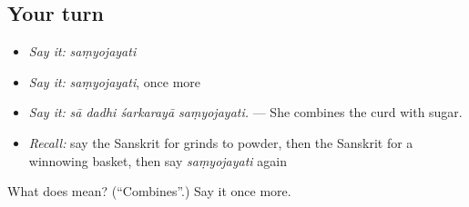 \subsection*{Your turn}
\begin{itemize}
\raggedright
  \item \emph{Say it:} \emph{saṃyojayati}
  \item \emph{Say it:} \emph{saṃyojayati}, once more
  \item \emph{Say it:} \emph{sā dadhi śarkarayā saṃyojayati.} — She combines the curd with sugar.
  \item \emph{Recall:} say the Sanskrit for grinds to powder, then the Sanskrit for a winnowing basket, then say \emph{saṃyojayati} again
\end{itemize}

\begin{tcolorbox}[breakable,colback=teal!4,colframe=teal!35!black,title={Before you move on}]
What does  mean? (\textquotedblleft{}Combines\textquotedblright{}.) Say it once more.
\end{tcolorbox}
